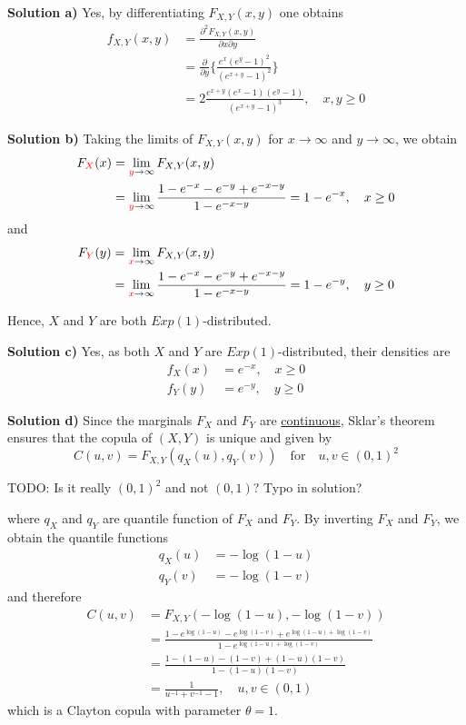 \textbf{Solution a)} Yes, by differentiating $F_{X,Y}(x,y)$ one obtains
\begin{align*}
    f_{X,Y}(x,y) &= \frac{\partial^2 F_{X,Y}(x,y)}{\partial x\partial y} \\
    &= \frac{\partial}{\partial y} \bigg\{\frac{e^x(e^y-1)^2}{(e^{x+y}-1)^2}\bigg\} \\
    &= 2\frac{e^{x+y}(e^x - 1)(e^y-1)}{(e^{x+y} - 1)^3}, \quad x,y\geq 0
\end{align*}

\textbf{Solution b)} Taking the limits of $F_{X,Y}(x,y)$ for $x\to\infty$ and $y \to\infty$, we obtain
\begin{align*}
    F_{\textcolor{red}{X}}(x) &= \lim_{\textcolor{red}{y}\to\infty}F_{X,Y}(x,y) \\
    &= \lim_{\textcolor{red}{y}\to\infty} \frac{1-e^{-x}-e^{-y}+e^{-x-y}}{1-e^{-x-y}} = 1 - e^{-x}, \quad x\geq 0
\end{align*}
and
\begin{align*}
    F_{\textcolor{red}{Y}}(y) &= \lim_{\textcolor{red}{x}\to\infty}F_{X,Y}(x,y) \\
    &= \lim_{\textcolor{red}{x}\to\infty} \frac{1-e^{-x}-e^{-y}+e^{-x-y}}{1-e^{-x-y}} = 1 - e^{-y}, \quad y\geq 0
\end{align*}

Hence, $X$ and $Y$ are both $Exp(1)$-distributed.

\textbf{Solution c)} Yes, as both $X$ and $Y$ are $Exp(1)$-distributed, their densities are
\begin{align*}
    f_X(x) &= e^{-x}, \quad x\geq 0 \\
    f_Y(y) &= e^{-y}, \quad y\geq 0
\end{align*}

\textbf{Solution d)} Since the marginals $F_X$ and $F_Y$ are \underline{continuous}, Sklar's theorem ensures that the copula of $(X,Y)$ is unique and given by
\[
    C(u,v) = F_{X,Y}(q_X(u), q_Y(v)) \quad \text{for} \quad u,v\in(0,1)^2
\]

TODO: Is it really $(0,1)^2$ and not $(0,1)$? Typo in solution?

where $q_X$ and $q_Y$ are quantile function of $F_X$ and $F_Y$. By inverting $F_X$ and $F_Y$, we obtain the quantile functions
\begin{align*}
    q_X(u) &= -\log(1-u) \\
    q_Y(v) &= -\log(1-v)
\end{align*}
and therefore
\begin{align*}
    C(u,v) &= F_{X,Y}(-\log(1-u), -\log(1-v)) \\
    &= \frac{1-e^{\log(1-u)}-e^{\log(1-v)}+e^{\log(1-u) + \log(1-v)}}{1 - e^{\log(1-u) + \log(1-v)}} \\
    &= \frac{1-(1-u)-(1-v)+(1-u)(1-v)}{1-(1-u)(1-v)} \\
    &= \frac{1}{u^{-1} + v^{-1} - 1}, \quad u,v\in(0,1)
\end{align*}
which is a Clayton copula with parameter $\theta = 1$.

